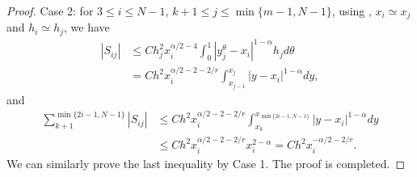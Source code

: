 \documentclass{amsart}
\theoremstyle{definition}
\theoremstyle{remark}
\newtheorem{remark}[theorem]{Remark}
\numberwithin{equation}{section}
\begin{document}
\begin{proof}
Case 2: for $3\le i \le N-1$, $k+1\le j\le \min\{m-1, N-1\}$, using , $x_i \simeq x_j$ and $h_i \simeq h_j$, we have
    \begin{equation*} %
      \begin{aligned}
        |S_{ij}| & \le C h_j^2 x_i^{\alpha/2-4} \int_{0}^{1}  |y_j^\theta - x_i|^{1-\alpha}  h_j d\theta \\
        & =  C h^2 x_i^{\alpha/2-2-2/r} \int_{x_{j-1}}^{x_{j}}  |y - x_i|^{1-\alpha}  dy,
      \end{aligned}
    \end{equation*}
    and
  \begin{equation*}
    \begin{aligned}
      \sum_{k+1}^{\min\{2i-1, N-1\}} |S_{ij}|
      &\le C h^2 x_i^{\alpha/2-2-2/r} \int_{x_{k}}^{x_{\min\{2i-1, N-1\}}} |y - x_i|^{1-\alpha}  dy    \\
        & \le C h^2  x_i^{\alpha/2-2-2/r}x_{i}^{2-\alpha} = C h^2 x_i^{-\alpha/2-2/r} .
    \end{aligned}
  \end{equation*}
  We can similarly prove the last inequality by Case 1.
  The proof is completed.
\end{proof}

\end{document}
